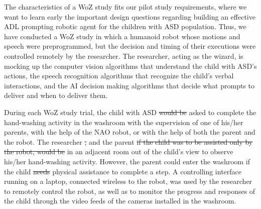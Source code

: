 \documentclass{ut-thesis}
\providecommand{\DIFaddtex}[1]{{\protect\color{blue}\uwave{#1}}} %
\providecommand{\DIFdeltex}[1]{{\protect\color{red}\sout{#1}}}                      %
\providecommand{\DIFaddbegin}{} %
\providecommand{\DIFaddend}{} %
\providecommand{\DIFdelbegin}{} %
\providecommand{\DIFdelend}{} %
\providecommand{\DIFadd}[1]{\texorpdfstring{\DIFaddtex{#1}}{#1}} %
\providecommand{\DIFdel}[1]{\texorpdfstring{\DIFdeltex{#1}}{}} %
\begin{document}
The characteristics of a WoZ study fits our pilot study requirements, where we want to learn early the important design questions regarding building an effective ADL prompting robotic agent for the children with ASD population.  Thus, we have conducted a WoZ study in which a humanoid robot whose motions and speech were preprogrammed, but the decision and timing of their executions were controlled remotely by the researcher.  The researcher, acting as the wizard, is mocking up the computer vision algorithms that understand the child with ASD's actions, the speech recognition algorithms that recognize the child's verbal interactions, and the AI decision making algorithms that decide what prompts to deliver and when to deliver them.

During each WoZ study trial, the child with ASD \DIFdelbegin \DIFdel{would be }\DIFdelend \DIFaddbegin \DIFadd{was }\DIFaddend asked to complete the hand-washing activity in the washroom with the supervision of one of his/her parents, with the help of the NAO robot, or with the help of both the parent and the robot. The researcher \DIFdelbegin \DIFdel{, }\DIFdelend and the parent \DIFdelbegin \DIFdel{if the child was to be assisted only by the robot, would be }\DIFdelend \DIFaddbegin \DIFadd{were }\DIFaddend in an adjacent room out of the child's view to observe his/her hand-washing activity.  However, the parent could enter the washroom if the child \DIFdelbegin \DIFdel{needs }\DIFdelend \DIFaddbegin \DIFadd{needed }\DIFaddend physical assistance to complete a step. A controlling interface running on a laptop, connected wireless to the robot, was used by the researcher to remotely control the robot, as well as to monitor the progress and responses of the child through the video feeds of the cameras installed in the washroom.
\end{document}
